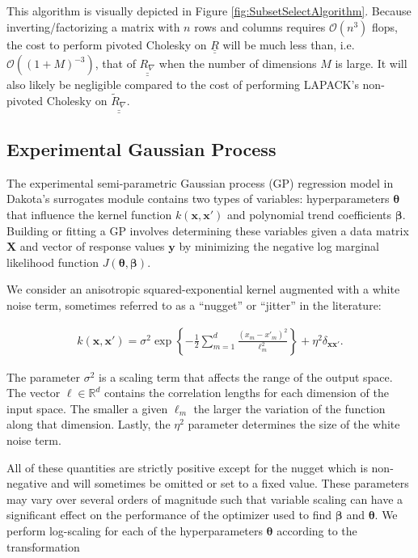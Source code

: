 This algorithm is visually depicted in Figure 
\ref{fig:SubsetSelectAlgorithm}.  Because inverting/factorizing a matrix 
with $n$ rows and columns requires $\mathcal{O}\left(n^3\right)$ flops, 
the cost to perform pivoted Cholesky on $\underline{\underline{R}}$ will be 
much less than, i.e. $\mathcal{O}\left((1+M)^{-3}\right)$, that of 
$\underline{\underline{R_{\nabla}}}$ when the number of dimensions $M$ 
is large.  It will also likely be negligible compared to the cost of
performing LAPACK's non-pivoted Cholesky on 
$\underline{\underline{\tilde{R}_{\nabla}}}$.

\subsection{Experimental Gaussian Process}
\label{SubSec:ExpGP}

The experimental semi-parametric Gaussian process (GP) regression model in 
Dakota's surrogates module contains two types of variables: hyperparameters 
$\boldsymbol{\theta}$ that influence the kernel function 
$k(\boldsymbol{x},\boldsymbol{x}')$ and polynomial trend coefficients 
$\boldsymbol{\beta}$. Building or fitting a GP involves determining these 
variables given a data matrix $\boldsymbol{X}$ and vector of response values 
$\boldsymbol{y}$ by minimizing the negative log marginal likelihood function
$J(\boldsymbol{\theta},\boldsymbol{\beta})$.

We consider an anisotropic squared-exponential kernel augmented with a white
noise term, sometimes referred to as a ``nugget'' or ``jitter'' in the 
literature:

\begin{gather}
k(\boldsymbol{x},\boldsymbol{x}') = \sigma^2 \exp \left\lbrace - \frac{1}{2} \sum_{m=1}^{d} \frac{ \left(x_m - x'_m \right)^2}{\ell_m^2} \right\rbrace + \eta^2 \delta_{\boldsymbol{x}\boldsymbol{x}'}.
\end{gather}

The parameter $\sigma^2$ is a scaling term that affects the range of the 
output space. The vector $\boldsymbol{\ell} \in \mathbb{R}^d$ contains the 
correlation lengths for each dimension of the input space. The smaller a 
given $\ell_m$ the larger the variation of the function along that dimension.
Lastly, the $\eta^2$ parameter determines the size of the white noise term.

All of these quantities are strictly positive except for the nugget which is non-negative and will sometimes be omitted or set to a fixed value. These parameters may vary over several orders of magnitude such that variable scaling can have a significant effect on the performance of the optimizer used to find $\boldsymbol{\beta}$ and $\boldsymbol{\theta}$. We perform log-scaling for each of the hyperparameters $\boldsymbol{\theta}$ according to the transformation 

